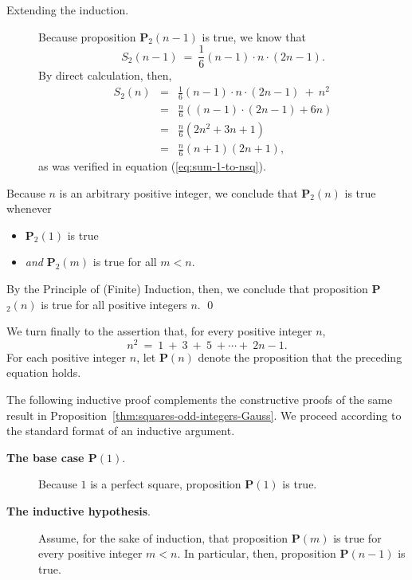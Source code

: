 {\begin{description}
\item[{\sf Extending the induction}.]
%
Because proposition {\bf P}$_2(n-1)$ is true, we know that
\[ S_2(n-1) \ = \
\frac{1}{6} (n-1) \cdot n \cdot (2n-1).
\]
By direct calculation, then,
\begin{eqnarray*}
S_2(n) & = &
\frac{1}{6} (n-1) \cdot n \cdot (2n-1) \ + \ n^2 \\
  & = &
\frac{n}{6} \left( (n-1) \cdot (2n-1) + 6n \right) \\
  & = & \frac{n}{6} \left( 2n^2 +3n + 1 \right) \\ 
  & = & \frac{n}{6} (n+1)(2n+1),
\end{eqnarray*}
as was verified in equation (\ref{eq:sum-1-to-nsq}).
\end{description}
Because $n$ is an arbitrary positive integer, we conclude that
{\bf P}$_2(n)$ is true whenever
\begin{itemize}
\item
{\bf P}$_2(1)$ is true
\item
{\em and}
{\bf P}$_2(m)$ is true for all $m < n$.
\end{itemize}
By the Principle of (Finite) Induction, then, we conclude that
proposition {\bf P}$_2(n)$ is true for all positive integers $n$.
\qed


\bigskip

%
We turn finally to the assertion that, for every positive integer $n$,
\[ n^2 \ = \ 1 \ + \  3 \ + \ 5 \ + \cdots + \ 2n-1. \]
For each positive integer $n$, let {\bf P}$(n)$ denote the proposition
that the preceding equation holds.

The following inductive proof complements the constructive proofs of
the same result in Proposition~\ref{thm:squares-odd-integers-Gauss}.
We proceed according to the standard format of an inductive argument.

\begin{description}
\item[{\bf The base case P$(1)$}.]
%
Because $1$ is a perfect square, proposition {\bf P}$(1)$ is true.

\item[{\bf The inductive hypothesis}.]
%
Assume, for the sake of induction, that proposition {\bf P}$(m)$ is
true for every positive integer $m < n$.  In particular, then,
proposition {\bf P}$(n-1)$ is true.


\end{description}}
